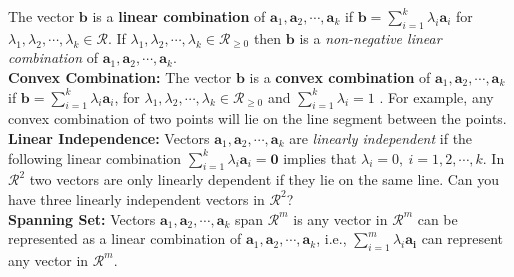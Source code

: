   The vector ${\mathbf b}$ is a {\bf linear combination} of ${\mathbf a_1}, {\mathbf a_2}, \cdots, {\mathbf a_k}$ if ${\mathbf b} = \sum_{i=1}^k \lambda_i {\mathbf a_i}$ for $\lambda_1, \lambda_2,\cdots, \lambda_k \in \mathcal{R}$. If $\lambda_1, \lambda_2,\cdots,\lambda_k \in \mathcal{R}_{\ge 0}$ then ${\mathbf b}$ is a {\it non-negative linear combination} of ${\mathbf a_1},{\mathbf a_2},\cdots,{\mathbf a_k}$. \\

{\bf Convex Combination:}  The vector ${\mathbf b}$ is a {\bf convex combination} of ${\mathbf a_1},{\mathbf a_2},\cdots,{\mathbf a_k}$ if ${\mathbf b} = \sum_{i=1}^k \lambda_i {\mathbf a_i}$, for $\lambda_1, \lambda_2,\cdots,\lambda_k \in \mathcal{R}_{\ge 0}$ and $\sum_{i=1}^k \lambda_i = 1$ . For example, any convex combination of two points will lie on the line segment between the points. \\

{\bf Linear Independence:}  Vectors ${\mathbf a_1},{\mathbf a_2},\cdots,{\mathbf a_k}$ are {\it linearly independent} if the following linear combination $\sum_{i=1}^k \lambda_i {\mathbf a_i} = {\mathbf 0}$ implies that $\lambda_i = 0,~ i = 1,2,\cdots,k$. In $\mathcal{R}^2$ two vectors are only linearly dependent if they lie on the same line. Can you have three linearly independent vectors in $\mathcal{R}^2$? \\




{\bf Spanning Set:}  Vectors ${\mathbf a_1},{\mathbf a_2},\cdots,{\mathbf a_k}$ span $\mathcal{R}^m$ is any vector in $\mathcal{R}^m$ can be represented as a linear combination of ${\mathbf a_1},{\mathbf a_2},\cdots,{\mathbf a_k}$, i.e., $\sum_{i=1}^m\lambda_i\mathbf{a_i}$ can represent any vector in $\mathcal{R}^m$. \\

